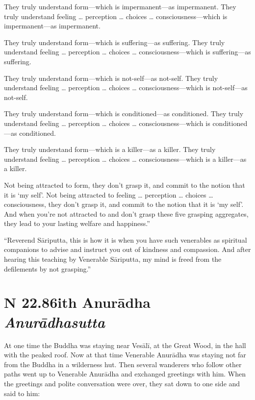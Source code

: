 \documentclass[12pt,openany]{book}%
\newcommand*{\suttatitleacronym}[1]{\smaller[2]{#1}\vspace*{.3em}}
\newcommand*{\suttatitletranslation}[1]{\linebreak{#1}}
\newcommand*{\suttatitleroot}[1]{\linebreak\smaller[2]\itshape{#1}}
\newcommand*{\tocacronym}[1]{\hspace*{-3.3em}{#1}\quad}
\newcommand*{\toctranslation}[1]{#1}
\newcommand*{\tocroot}[1]{(\textit{#1})}
\begin{document}
They truly understand form—which is impermanent—as impermanent. They truly understand feeling … perception … choices … consciousness—which is impermanent—as impermanent. 

They truly understand form—which is suffering—as suffering. They truly understand feeling … perception … choices … consciousness—which is suffering—as suffering. 

They truly understand form—which is not-self—as not-self. They truly understand feeling … perception … choices … consciousness—which is not-self—as not-self. 

They truly understand form—which is conditioned—as conditioned. They truly understand feeling … perception … choices … consciousness—which is conditioned—as conditioned. 

They truly understand form—which is a killer—as a killer. They truly understand feeling … perception … choices … consciousness—which is a killer—as a killer. 

Not being attracted to form, they don’t grasp it, and commit to the notion that it is ‘my self’. Not being attracted to feeling … perception … choices … consciousness, they don't grasp it, and commit to the notion that it is ‘my self’. And when you’re not attracted to and don’t grasp these five grasping aggregates, they lead to your lasting welfare and happiness.” 

“Reverend \textsanskrit{Sāriputta}, this is how it is when you have such venerables as spiritual companions to advise and instruct you out of kindness and compassion. And after hearing this teaching by Venerable \textsanskrit{Sāriputta}, my mind is freed from the defilements by not grasping.” 

%
\section*{{\suttatitleacronym SN 22.86}{\suttatitletranslation With Anurādha }{\suttatitleroot Anurādhasutta}}
\addcontentsline{toc}{section}{\tocacronym{SN 22.86} \toctranslation{With Anurādha } \tocroot{Anurādhasutta}}

At one time the Buddha was staying near \textsanskrit{Vesālī}, at the Great Wood, in the hall with the peaked roof. Now at that time Venerable \textsanskrit{Anurādha} was staying not far from the Buddha in a wilderness hut. Then several wanderers who follow other paths went up to Venerable \textsanskrit{Anurādha} and exchanged greetings with him. When the greetings and polite conversation were over, they sat down to one side and said to him: 
\end{document}
